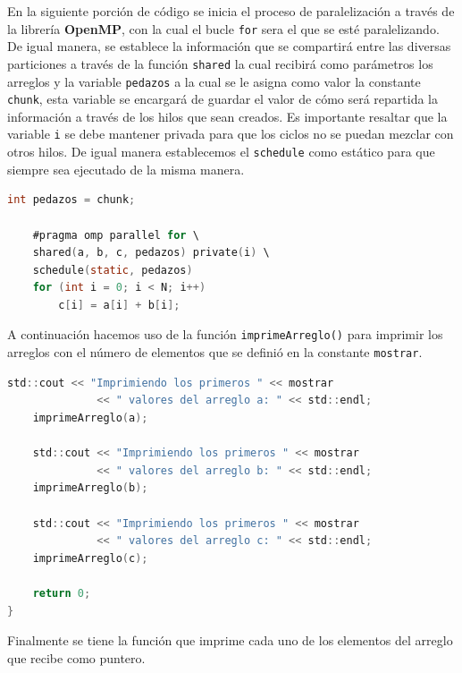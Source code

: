 \documentclass[12pt,a4paper]{article}
\begin{document}
\vspace{1em}

En la siguiente porción de código se inicia el proceso de paralelización a través de la librería \textbf{OpenMP}, con la cual el bucle \texttt{for} sera el que se esté paralelizando. De igual manera, se establece la información que se compartirá entre las diversas particiones a través de la función \texttt{shared} la cual recibirá como parámetros los arreglos y la variable \texttt{pedazos} a la cual se le asigna como valor la constante \texttt{chunk}, esta variable se encargará de guardar el valor de cómo será repartida la información a través de los hilos que sean creados. Es importante resaltar que la variable \texttt{i} se debe mantener privada para que los ciclos no se puedan mezclar con otros hilos. De igual manera establecemos el \texttt{schedule} como estático para que siempre sea ejecutado de la misma manera.

\begin{lstlisting}[language=C, numbers=none]
    int pedazos = chunk;

    #pragma omp parallel for \
    shared(a, b, c, pedazos) private(i) \
    schedule(static, pedazos)
    for (int i = 0; i < N; i++)
        c[i] = a[i] + b[i];
\end{lstlisting}

\vspace{1em}

A continuación hacemos uso de la función \texttt{imprimeArreglo()} para imprimir los arreglos con el número de elementos que se definió en la constante \texttt{mostrar}.

\begin{lstlisting}[language=C, numbers=none]
    std::cout << "Imprimiendo los primeros " << mostrar 
              << " valores del arreglo a: " << std::endl;
    imprimeArreglo(a);

    std::cout << "Imprimiendo los primeros " << mostrar 
              << " valores del arreglo b: " << std::endl;
    imprimeArreglo(b);

    std::cout << "Imprimiendo los primeros " << mostrar 
              << " valores del arreglo c: " << std::endl;
    imprimeArreglo(c);

    return 0;
}
\end{lstlisting}

\vspace{1em}

Finalmente se tiene la función que imprime cada uno de los elementos del arreglo que recibe como puntero.
\end{document}
